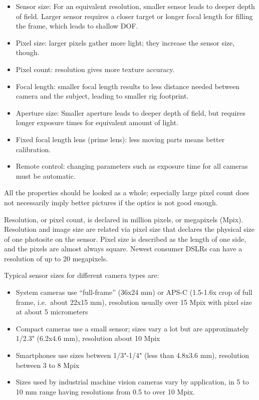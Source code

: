 \begin{itemize}
	\item Sensor size: For an equivalent resolution, smaller sensor leads to deeper depth of field. Larger sensor requires a closer target or longer focal length for filling the frame, which leads to shallow DOF.
	\item Pixel size: larger pixels gather more light; they increase the sensor size, though.
	\item Pixel count: resolution gives more texture accuracy.
	\item Focal length: smaller focal length results to less distance needed between camera and the subject, leading to smaller rig footprint.
	\item Aperture size: Smaller aperture leads to deeper depth of field, but requires longer exposure times for equivalent amount of light.
	\item Fixed focal length lens (prime lens): less moving parts means better calibration.
	\item Remote control: changing parameters such as exposure time for all cameras must be automatic.
\end{itemize}

All the properties should be looked as a whole; especially large pixel count does not necessarily imply better pictures if the optics is not good enough.

Resolution, or pixel count, is declared in million pixels, or megapixels (Mpix).
Resolution and image size are related via pixel size that declares the physical size of one photosite on the sensor.
Pixel size is described as the length of one side, and the pixels are almost always square.
Newest consumer DSLRs can have a resolution of up to 20 megapixels.




Typical sensor sizes for different camera types are:

\begin{itemize}
	\item System cameras use ``full-frame'' (36x24 mm) or APS-C (1.5-1.6x crop of full frame, i.e.~about 22x15 mm), resolution usually over 15 Mpix with pixel size at about 5 micrometers
	\item Compact cameras use a small sensor; sizes vary a lot but are approximately 1/2.3" (6.2x4.6 mm), resolution about 10 Mpix
	\item Smartphones use sizes between 1/3"-1/4" (less than 4.8x3.6 mm), resolution between 3 to 8 Mpix
	\item Sizes used by industrial machine vision cameras vary by application, in 5 to 10 mm range having resolutions from 0.5 to over 10 Mpix.
\end{itemize}

